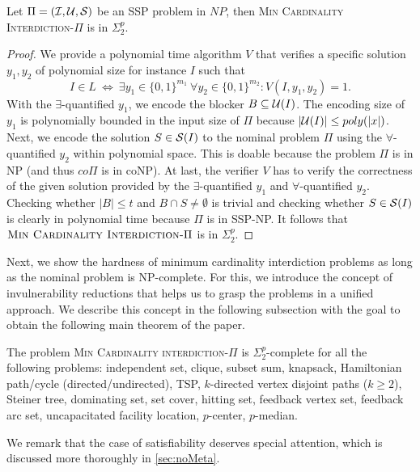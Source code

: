 \begin{lemma}
\label{lem:containment}
    Let $\Pi = (\mathcal{I}, \mathcal{U}, \mathcal{S})$ be an SSP problem in $NP$, then \textsc{Min Cardinality Interdiction}-$\Pi$ is in $\Sigma^p_2$.
\end{lemma}
\begin{proof}
    We provide a polynomial time algorithm $V$ that verifies a specific solution $y_1, y_2$ of polynomial size for instance $I$ such that
    $$
        I \in L \ \Leftrightarrow \ \exists y_1 \in \{0,1\}^{m_1} \ \forall y_2 \in \{0,1\}^{m_2} : V(I, y_1, y_2) = 1.
    $$
    With the $\exists$-quantified $y_1$, we encode the blocker $B \subseteq \mathcal{U}(I)$.
    The encoding size of $y_1$ is polynomially bounded in the input size of $\Pi$ because $|\mathcal{U}(I)| \leq poly(|x|)$.
    Next, we encode the solution $S \in \mathcal{S}(I)$ to the nominal problem $\Pi$ using the $\forall$-quantified $y_2$ within polynomial space.
    This is doable because the problem $\Pi$ is in NP (and thus $co\Pi$ is in coNP).
    At last, the verifier $V$ has to verify the correctness of the given solution provided by the $\exists$-quantified $y_1$ and $\forall$-quantified $y_2$.
    Checking whether $|B| \leq t$ and $B \cap S \neq \emptyset$ is trivial and checking whether $S \in \mathcal{S}(I)$ is clearly in polynomial time because $\Pi$ is in SSP-NP.
    It follows that $\textsc{Min Cardinality Interdiction-}\Pi$ is in $\Sigma^p_2$.
\end{proof}

Next, we show the hardness of minimum cardinality interdiction problems as long as the nominal problem is NP-complete.
For this, we introduce the concept of invulnerability reductions that helps us to grasp the problems in a unified approach.
We describe this concept in the following subsection with the goal to obtain the following main theorem of the paper.

\begin{theorem}
\label{thm:min-card-interdiction}
    The problem \textsc{Min Cardinality interdiction-$\Pi$} is $\Sigma^p_2$-complete for all the following problems:
    independent set,
    clique,
    subset sum,
    knapsack,
    Hamiltonian path/cycle (directed/undirected),
    TSP,
    $k$-directed vertex disjoint paths ($k \geq 2$),
    Steiner tree,
    dominating set,
    set cover,
    hitting set, feedback vertex set,
    feedback arc set,
    uncapacitated facility location,
    $p$-center,
    $p$-median.
\end{theorem}

We remark that the case of satisfiability deserves special attention, which is discussed more thoroughly in \cref{sec:noMeta}.

